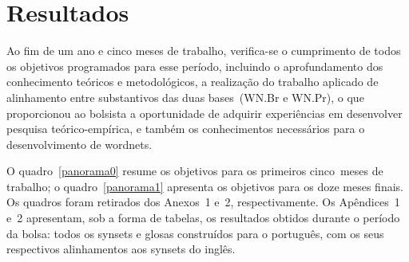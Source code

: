 \chapter{Resultados}


Ao fim de um ano e cinco meses de trabalho, verifica-se o cumprimento de todos
os objetivos programados para esse período, incluindo o aprofundamento dos
conhecimento teóricos e metodológicos, a realização do trabalho aplicado de
alinhamento entre substantivos das duas bases~(WN.Br e WN.Pr), o que
proporcionou ao bolsista a oportunidade de adquirir experiências em desenvolver
pesquisa teórico-empírica, e também os conhecimentos necessários para o
desenvolvimento de wordnets.

O quadro~\ref{panorama0} resume os objetivos para os primeiros cinco~meses de
trabalho; o quadro~\ref{panorama1} apresenta os objetivos para os doze meses
finais. Os quadros foram retirados dos Anexos~1 e~2, respectivamente. Os
Apêndices~1 e~2 apresentam, sob a forma de tabelas, os resultados obtidos
durante o período da bolsa: todos os synsets e glosas construídos para o
português, com os seus respectivos alinhamentos aos synsets do inglês.

